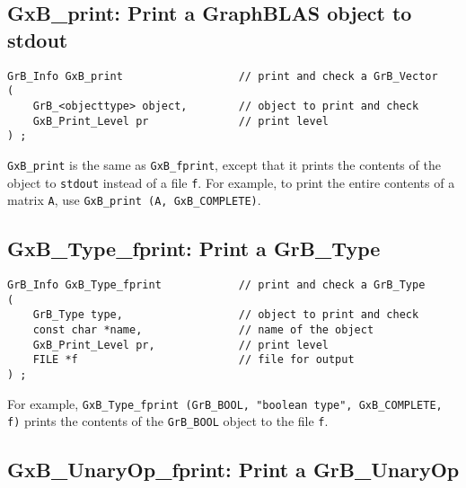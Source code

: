 \documentclass[12pt]{article}
\begin{document}
\subsection{{\sf GxB\_print:} Print a GraphBLAS object to {\sf stdout}} %
\label{gxb_print}

\begin{mdframed}[userdefinedwidth=6in]
{\footnotesize
\begin{verbatim}
GrB_Info GxB_print                  // print and check a GrB_Vector
(
    GrB_<objecttype> object,        // object to print and check
    GxB_Print_Level pr              // print level
) ;
\end{verbatim} } \end{mdframed}

\verb'GxB_print' is the same as \verb'GxB_fprint', except that it prints the
contents of the object to \verb'stdout' instead of a file \verb'f'.  For
example, to print the entire contents of a matrix \verb'A',  use
\verb'GxB_print (A, GxB_COMPLETE)'.

\subsection{{\sf GxB\_Type\_fprint:} Print a {\sf GrB\_Type}}

\begin{mdframed}[userdefinedwidth=6in]
{\footnotesize
\begin{verbatim}
GrB_Info GxB_Type_fprint            // print and check a GrB_Type
(
    GrB_Type type,                  // object to print and check
    const char *name,               // name of the object
    GxB_Print_Level pr,             // print level
    FILE *f                         // file for output
) ;
\end{verbatim} } \end{mdframed}

For example, \verb'GxB_Type_fprint (GrB_BOOL, "boolean type", GxB_COMPLETE, f)'
prints the contents of the \verb'GrB_BOOL' object to the file \verb'f'.

\newpage
\subsection{{\sf GxB\_UnaryOp\_fprint:} Print a {\sf GrB\_UnaryOp}}
\end{document}
